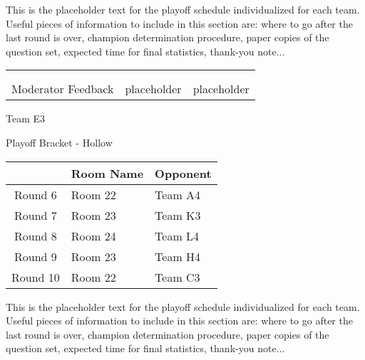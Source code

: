 \documentclass{article}%
\begin{document}
\vspace*{30pt}%
\linebreak%
This is the placeholder text for the playoff schedule individualized for each team. Useful pieces of information to include in this section are: where to go after the last round is over, champion determination procedure, paper copies of the question set, expected time for final statistics, thank{-}you note...%
\vspace*{30pt}%
\newline%
%
\begin{tabularx}{\textwidth}{YYY}%
  &  &  \\%
\\%
Moderator Feedback&placeholder&placeholder\\%
\end{tabularx}%
\newpage%
\begin{center}%
\begin{Huge}%
Team E3%
\end{Huge}%
\vspace*{12pt}%
\linebreak%
\begin{Large}%
Playoff Bracket {-} Hollow%
\end{Large}%
\end{center}%
\vspace*{4pt}%
%
\begin{tabularx}{\textwidth}{|c|Y|Y|}%
\hline%
&Room Name&Opponent\\%
\hline%
Round 6&Room 22&Team A4\\%
Round 7&Room 23&Team K3\\%
Round 8&Room 24&Team L4\\%
Round 9&Room 23&Team H4\\%
Round 10&Room 22&Team C3\\%
\hline%
\end{tabularx}%
\vspace*{30pt}%
\linebreak%
This is the placeholder text for the playoff schedule individualized for each team. Useful pieces of information to include in this section are: where to go after the last round is over, champion determination procedure, paper copies of the question set, expected time for final statistics, thank{-}you note...%
\vspace*{30pt}%
\end{document}
